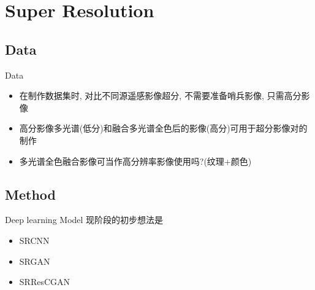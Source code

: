 \section{Super Resolution}

\subsection{Data}
\begin{frame}{Data}
    \small
    \begin{itemize}
        \item 在制作数据集时, 对比不同源遥感影像超分, 不需要准备哨兵影像, 只需高分影像
        \item 高分影像多光谱(低分)和融合多光谱全色后的影像(高分)可用于超分影像对的制作
        \item 多光谱全色融合影像可当作高分辨率影像使用吗?(纹理+颜色)
    \end{itemize}
\end{frame}

\subsection{Method}
\begin{frame}{Deep learning Model}
    \small
    现阶段的初步想法是
    \begin{itemize}
        \item SRCNN
        \item SRGAN
        \item SRResCGAN
    \end{itemize}
    
\end{frame}



